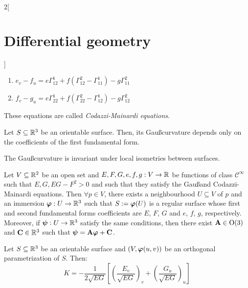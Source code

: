 \documentclass[../../../main.tex]{subfiles}
\begin{document}
\begin{multicols}{2}[\section{Differential geometry}]
\begin{proposition}
\begin{enumerate}
      \item $\displaystyle e_v-f_u=e\Gamma_{12}^1+f\left(\Gamma_{12}^2-\Gamma_{11}^1\right)-g\Gamma_{11}^2$
      \item $\displaystyle f_v-g_u=e\Gamma_{22}^1+f\left(\Gamma_{22}^2-\Gamma_{12}^1\right)-g\Gamma_{12}^2$
    \end{enumerate}
    These equations are called \emph{Codazzi-Mainardi equations}.
  \end{proposition}
  \begin{corollary}
    Let $S\subseteq\mathbb{R}^3$ be an orientable surface. Then, its Gau\ss\space curvature depends only on the coefficients of the first fundamental form.
  \end{corollary}
  \begin{theorem}
    The Gau\ss\space curvature is invariant under local isometries between surfaces.
  \end{theorem}
  \begin{theorem}
    Let $V\subseteq\mathbb{R}^2$ be an open set and $E,F,G,e,f,g:V\rightarrow\mathbb{R}$ be functions of class $\mathcal{C}^\infty$ such that $E,G,EG-F^2>0$ and such that they satisfy the Gau\ss\space  and Codazzi-Mainardi equations. Then $\forall p\in V$, there exists a neighbourhood $U\subseteq V$ of $p$ and an immersion $\boldsymbol{\mathrm{\varphi}}:U\rightarrow\mathbb{R}^3$ such that $S:=\boldsymbol{\mathrm{\varphi}}(U)$ is a regular surface whose first and second fundamental forms coefficients are $E$, $F$, $G$ and $e$, $f$, $g$, respectively. Moreover, if $\boldsymbol{\mathrm{\psi}}:U\rightarrow\mathbb{R}^3$ satisfy the same conditions, then there exist $\boldsymbol{\mathrm{A}}\in\text{O}(3)$ and $\boldsymbol{\mathrm{C}}\in\mathbb{R}^3$ such that $\boldsymbol{\mathrm{\psi}}=\boldsymbol{\mathrm{A\varphi}}+\boldsymbol{\mathrm{C}}$.
  \end{theorem}
  \begin{proposition}
    Let $S\subseteq\mathbb{R}^3$ be an orientable surface and $(V,\boldsymbol{\mathrm{\varphi}}(u,v))$ be an orthogonal parametrization of $S$. Then: $$K=-\frac{1}{2\sqrt{EG}}\left[{\left(\frac{E_v}{\sqrt{EG}}\right)}_v+{\left(\frac{G_u}{\sqrt{EG}}\right)}_u\right]$$
  \end{proposition}

\end{multicols}
\end{document}
